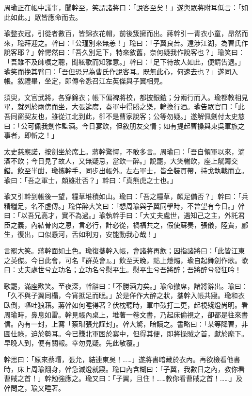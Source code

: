 周瑜正在帳中議事，聞幹至，笑謂諸將曰：「說客至矣！」遂與眾將附耳低言：「如此如此。」眾皆應命而去。

瑜整衣冠，引從者數百，皆錦衣花帽，前後簇擁而出。蔣幹引一青衣小童，昂然而來，瑜拜迎之。幹曰：「公瑾別來無恙！」瑜曰：「子翼良苦。遠涉江湖，為曹氏作說客耶？」幹愕然曰：「吾久別足下，特來敘舊，奈何疑我作說客也？」瑜笑曰：「吾雖不及師嚝之聰，聞絃歌而知雅意。」幹曰：「足下待故人如此，便請告退。」瑜笑而挽其臂曰：「吾但恐兄為曹氏作說客耳。既無此心，何速去也？」遂同入帳。敘禮畢，坐定，即傳令悉召江左英傑與子翼相見。

須臾，文官武將，各穿錦衣；帳下偏裨將校，都披銀鎧；分兩行而入。瑜都教相見畢，就列於兩傍而坐，大張筵席，奏軍中得勝之樂，輪換行酒。瑜告眾官曰：「此吾同窗契友也，雖從江北到此，卻不是曹家說客；公等勿疑。」遂解佩劍付太史慈曰：「公可佩我劍作監酒。今日宴飲，但敘朋友交情；如有提起曹操與東吳軍旅之事者，即斬之！」

太史慈應諾，按劍坐於席上。蔣幹驚愕，不敢多言。周瑜曰：「吾自領軍以來，滴酒不飲；今日見了故人，又無疑忌，當飲一醉。」說罷，大笑暢飲，座上觥籌交錯。飲至半酣，瑜攜幹手，同步出帳外。左右軍士，皆全裝貫帶，持戈執戟而立。瑜曰：「吾之軍士，頗雄壯否？」幹曰：「真熊虎之士也。」

瑜又引幹到帳後一望，糧草堆積如山。瑜曰：「吾之糧草，頗足備否？」幹曰：「兵精糧足，名不虛傳。」瑜佯醉大笑曰：「想周瑜與子翼同學時，不曾望有今日。」幹曰：「以吾兄高才，實不為過。」瑜執幹手曰：「大丈夫處世，遇知己之主，外託君臣之義，內結骨肉之恩，言必行，計必從，禍福共之，假使蘇奏，張儀，陸賈，酈生，復出，口似懸河，舌如利刃，安能動我心哉！」

言罷大笑。蔣幹面如土色。瑜復攜幹入帳，會諸將再飲；因指諸將曰：「此皆江東之英傑。今日此會，可名『群英會』。」飲至天晚，點上燈燭，瑜自起舞劍作歌。歌曰：丈夫處世兮立功名；立功名兮慰平生。慰平生兮吾將醉；吾將醉兮發狂吟！

歌罷，滿座歡笑。至夜深，幹辭曰：「不勝酒力矣。」瑜命撤席，諸將辭出。瑜曰：「久不與子翼同榻，今宵抵足而眠。」於是佯作大醉之狀，攜幹入帳共寢。瑜和衣臥倒，嘔吐狼藉。蔣幹如何睡得著？伏枕聽時，軍中鼓打二更，起視殘燈尚明。看周瑜時，鼻息如雷。幹見帳內桌上，堆著一卷文書，乃起床偷視之，卻都是往來書信。內有一封，上寫「蔡瑁張允謹封」。幹大驚，暗讀之。書略曰：「某等降曹，非圖仕祿，迫於勢耳。今已賺北軍困於寨中，但得其便，即將操賊之首，獻於麾下。早晚人到，便有關報。幸勿見疑。先此敬覆。」

幹思曰：「原來蔡瑁，張允，結連東吳！……」遂將書暗藏於衣內。再欲檢看他書時，床上周瑜翻身，幹急滅燈就寢。瑜口內含糊曰：「子翼，我數日之內，教你看曹賊之首！」幹勉強應之。瑜又曰：「子翼，且住！……教你看曹賊之首！……」及幹問之，瑜又睡著。

